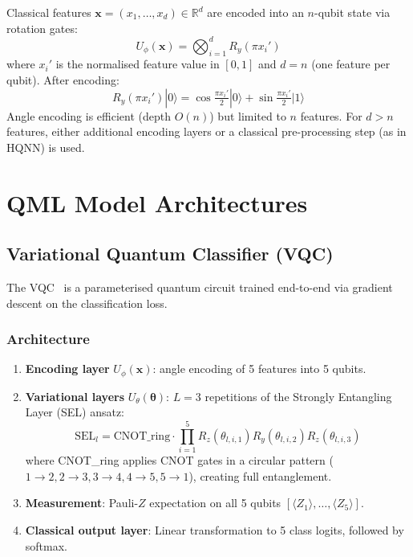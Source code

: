 \documentclass[journal]{IEEEtran}
\newcommand{\ket}[1]{|#1\rangle}
\newcommand{\expect}[1]{\langle #1 \rangle}
\newcommand{\vect}[1]{\boldsymbol{#1}}
\begin{document}
Classical features $\vect{x} = (x_1, \dots, x_d) \in \mathbb{R}^d$ are encoded
into an $n$-qubit state via rotation gates:
\begin{equation}
  U_\phi(\vect{x}) = \bigotimes_{i=1}^{d} R_y(\pi x_i')
\end{equation}
where $x_i'$ is the normalised feature value in $[0,1]$ and $d = n$ (one
feature per qubit). After encoding:
\begin{equation}
  R_y(\pi x_i')\ket{0} = \cos\!\tfrac{\pi x_i'}{2}\ket{0} + \sin\!\tfrac{\pi x_i'}{2}\ket{1}
\end{equation}
Angle encoding is efficient (depth $O(n)$) but limited to $n$ features.
For $d > n$ features, either additional encoding layers or a classical
pre-processing step (as in HQNN) is used.

\section{QML Model Architectures}
\label{sec:architectures}

\subsection{Variational Quantum Classifier (VQC)}
\label{sec:vqc}

The VQC~\cite{schuld2020circuit} is a parameterised quantum circuit trained
end-to-end via gradient descent on the classification loss.

\subsubsection{Architecture}

\begin{enumerate}
  \item \textbf{Encoding layer} $U_\phi(\vect{x})$: angle encoding of 5 features
        into 5 qubits.
  \item \textbf{Variational layers} $U_\theta(\vect{\theta})$: $L=3$ repetitions
        of the Strongly Entangling Layer (SEL) ansatz:
        \begin{equation}
          \text{SEL}_l = \text{CNOT\_ring} \cdot \prod_{i=1}^{5} R_z(\theta_{l,i,1})
          R_y(\theta_{l,i,2}) R_z(\theta_{l,i,3})
        \end{equation}
        where CNOT\_ring applies CNOT gates in a circular pattern
        ($1\to2, 2\to3, 3\to4, 4\to5, 5\to1$), creating full entanglement.
  \item \textbf{Measurement}: Pauli-$Z$ expectation on all 5 qubits
        $[\expect{Z_1},\dots,\expect{Z_5}]$.
  \item \textbf{Classical output layer}: Linear transformation to 5 class logits,
        followed by softmax.
\end{enumerate}
\end{document}
